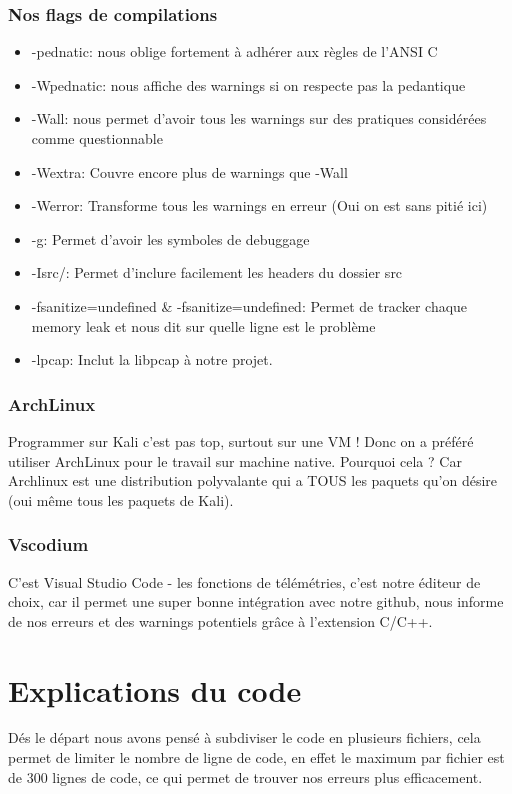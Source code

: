 \documentclass[a4paper]{report}
\begin{document}
\section{Nos flags de compilations}
\label{sec:org8947535}
\begin{itemize}
\item -pednatic: nous oblige fortement à adhérer aux règles de l'ANSI C
\item -Wpednatic: nous affiche des warnings si on respecte pas la pedantique
\item -Wall: nous permet d'avoir tous les warnings sur des pratiques considérées comme questionnable
\item -Wextra: Couvre encore plus de warnings que -Wall
\item -Werror: Transforme tous les warnings en erreur (Oui on est sans pitié ici)
\item -g: Permet d'avoir les symboles de debuggage
\item -Isrc/: Permet d'inclure facilement les headers du dossier src
\item -fsanitize=undefined \& -fsanitize=undefined: Permet de tracker chaque memory leak et nous dit sur quelle ligne est le problème
\item -lpcap: Inclut la libpcap à notre projet.
\end{itemize}

\section{ArchLinux}
\label{sec:orgb12fcba}
Programmer sur Kali c'est pas top, surtout sur une VM ! Donc on a préféré utiliser ArchLinux pour le travail sur machine native.
Pourquoi cela ? Car Archlinux est une distribution polyvalante qui a TOUS les paquets qu'on désire (oui même tous les paquets de Kali).

\section{Vscodium}
\label{sec:org641df5b}
C'est Visual Studio Code - les fonctions de télémétries, c'est notre éditeur de choix, car il permet une super bonne intégration avec notre github,
nous informe de nos erreurs et des warnings potentiels grâce à l'extension C/C++.
\part{Explications du code}
\label{sec:orgba8b3a9}
Dés le départ nous avons pensé à subdiviser le code en plusieurs fichiers, cela permet de limiter le nombre de ligne de code, en effet le maximum par fichier est de 300 lignes de code, ce qui permet de trouver nos erreurs plus efficacement.
\end{document}

